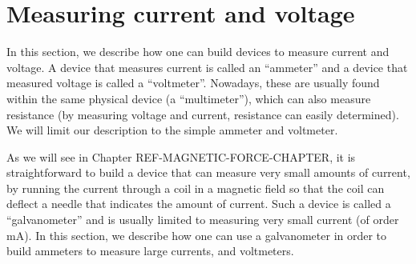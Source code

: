 \section{Measuring current and voltage}
In this section, we describe how one can build devices to measure current and voltage. A device that measures current is called an ``ammeter'' and a device that measured voltage is called a ``voltmeter''. Nowadays, these are usually found within the same physical device (a ``multimeter''), which can also measure resistance (by measuring voltage and current, resistance can easily determined). We will limit our description to the simple ammeter and voltmeter. 

As we will see in Chapter REF-MAGNETIC-FORCE-CHAPTER, it is straightforward to build a device that can measure very small amounts of current, by running the current through a coil in a magnetic field so that the coil can deflect a needle that indicates the amount of current. Such a device is called a ``galvanometer'' and is usually limited to measuring very small current (of order \si{mA}). In this section, we describe how one can use a galvanometer in order to build ammeters to measure large currents, and voltmeters. 

